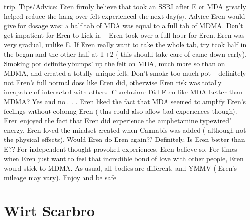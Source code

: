 \documentclass[12pt]{book}
\begin{document}
trip. Tips/Advice: Eren firmly believe that took an SSRI after E or MDA greatly helped reduce the hang over felt experienced the next day(s). Advice Eren would give for dosage was: a half tab of MDA was equal to a full tab of MDMA. Don't get impatient for Eren to kick in -- Eren took over a full hour for Eren. Eren was very gradual, unlike E. If Eren really want to take the whole tab, try took half in the began and the other half at T+2 ( this should take care of came down early). Smoking pot definitelybumps' up the felt on MDA, much more so than on MDMA, and created a totally unique felt. Don't smoke too much pot -- definitely not Eren's full normal dose like Eren did, otherwise Eren risk was totally incapable of interacted with others. Conclusion: Did Eren like MDA better than MDMA? Yes and no . . .  Eren liked the fact that MDA seemed to amplify Eren's feelings without coloring Eren ( this could also allow bad experiences though). Eren enjoyed the fact that Eren did experience the amphetamine typewired' energy. Eren loved the mindset created when Cannabis was added ( although not the physical effects). Would Eren do Eren again?? Definitely. Is Eren better than E?? For independent thought provoked experiences, Eren believe so. For times when Eren just want to feel that incredible bond of love with other people, Eren would stick to MDMA. As usual, all bodies are different, and YMMV ( Eren's mileage may vary). Enjoy and be safe.



\chapter{Wirt Scarbro}
\end{document}
